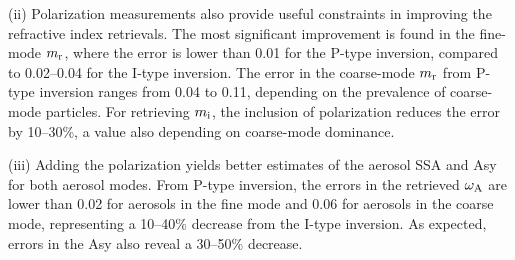 (ii) Polarization measurements also provide useful constraints in improving the
refractive index retrievals. The most significant improvement is found in the
fine-mode $m_\text{r}$, where the error is lower than 0.01 for the P-type inversion,
compared to 0.02--0.04 for the I-type inversion. The error in the coarse-mode
$m_\text{r}$ from P-type inversion ranges from 0.04 to 0.11, depending on the prevalence
of coarse-mode particles. For retrieving $m_\text{i}$, the inclusion of polarization
reduces the error by 10--30\%, a value also depending on coarse-mode dominance. 

(iii) Adding the polarization yields better estimates of the aerosol SSA and
Asy for both aerosol modes. From P-type inversion, the errors in the retrieved
$\omega_\text{A}$ are lower than 0.02 for aerosols in the fine mode and 0.06 for aerosols in
the coarse mode, representing a 10--40\% decrease from the I-type inversion. As
expected, errors in the Asy also reveal a 30--50\% decrease. 

